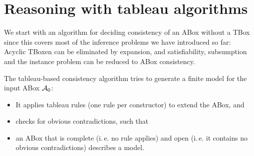 \documentclass[openany]{scrbook}
\theoremstyle{break}
\theoremstyle{nonumberbreak}
\theoremstyle{nonumberplain}
\theoremstyle{nonumberbreak}
\newcommand{\ie}{i{.}\,e{.}\xspace}
\begin{document}
\chapter{Reasoning with tableau algorithms}
We start with an algorithm for deciding consistency of an ABox without
a TBox since this covers most of the inference problems we have
introduced so far: Acyclic TBoxen can be eliminated by expansion, and
satisfiability, subsumption and the instance problem can be reduced to
ABox consistency.

The tableau-based consistency algorithm tries to generate a finite
model for the input ABox ${\cal A}_0$:
\begin{itemize}
\item It applies tableau rules (one rule per constructor) to extend
  the ABox, and
\item checks for obvious contradictions, such that
\item an ABox that is complete (\ie no rule applies) and open (\ie it
  contains no obvious contradictions) describes a model.
\end{itemize}
\end{document}
